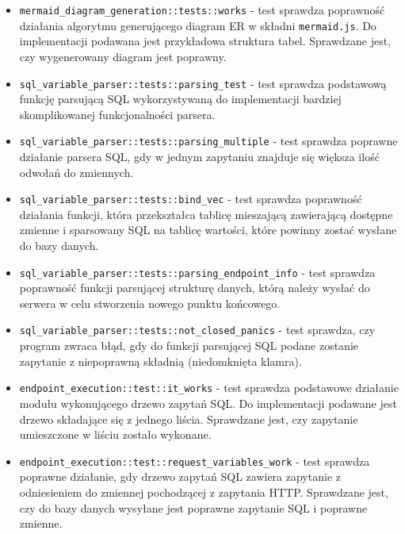 \begin{itemize}

    \item \verb|mermaid_diagram_generation::tests::works| - test sprawdza
        poprawność działania algorytmu generującego diagram ER w składni
        \verb|mermaid.js|. Do implementacji podawana jest przykładowa struktura
        tabel. Sprawdzane jest, czy wygenerowany diagram jest poprawny.

    \item \verb|sql_variable_parser::tests::parsing_test| - test sprawdza
        podstawową funkcję parsującą SQL wykorzystywaną do implementacji
        bardziej skomplikowanej funkcjonalności parsera.

    \item \verb|sql_variable_parser::tests::parsing_multiple| - test sprawdza
        poprawne działanie parsera SQL, gdy w jednym zapytaniu znajduje się
        większa ilość odwołań do zmiennych.

    \item \verb|sql_variable_parser::tests::bind_vec| - test sprawdza poprawność
        działania funkcji, która przekształca tablicę mieszającą zawierającą
        dostępne zmienne i sparsowany SQL na tablicę wartości, które powinny
        zostać wysłane do bazy danych.

    \item \verb|sql_variable_parser::tests::parsing_endpoint_info| - test
        sprawdza poprawność funkcji parsującej strukturę danych, którą należy
        wysłać do serwera w celu stworzenia nowego punktu końcowego.

    \item \verb|sql_variable_parser::tests::not_closed_panics| - test sprawdza,
        czy program zwraca błąd, gdy do funkcji parsującej SQL podane zostanie
        zapytanie z niepoprawną składnią (niedomknięta klamra).

    \item \verb|endpoint_execution::test::it_works| - test sprawdza podstawowe
        działanie modułu wykonującego drzewo zapytań SQL. Do implementacji
        podawane jest drzewo składające się z jednego liścia. Sprawdzane jest,
        czy zapytanie umieszczone w liściu zostało wykonane.
        
    \item \verb|endpoint_execution::test::request_variables_work| - test
        sprawdza poprawne działanie, gdy drzewo zapytań SQL zawiera zapytanie z
        odniesieniem do zmiennej pochodzącej z zapytania HTTP. Sprawdzane jest,
        czy do bazy danych wysyłane jest poprawne zapytanie SQL i poprawne
        zmienne.


\end{itemize}
